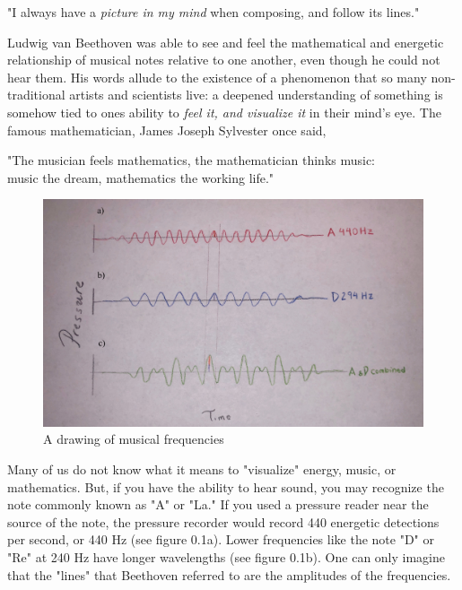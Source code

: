 \documentclass[12pt]{ucsddissertation}
\begin{document}
\begin{dissertationintroduction}
\begin{center}
    "I always have a \textit{picture in my mind} when composing, and follow its lines."
\end{center}

Ludwig van Beethoven was able to see and feel the mathematical and energetic relationship of musical notes relative to one another, even though he could not hear them. His words allude to the existence of a phenomenon that so many non-traditional artists and scientists live: a deepened understanding of something is somehow tied to ones ability to \textit{feel it, and visualize it} in their mind's eye. The famous mathematician, James Joseph Sylvester once said, 

\begin{center}
    "The musician feels mathematics, the mathematician thinks music: \\ music the dream, mathematics the working life."
\end{center}

\begin{figure}
\centering
        \includegraphics[scale=0.1]{frequencies.jpeg}
        \caption{A drawing of musical frequencies}
\label{fig:frequencies of music}
\end{figure}

Many of us do not know what it means to "visualize" energy, music, or mathematics. But, if you have the ability to hear sound, you may recognize the note commonly known as "A" or "La." If you used a pressure reader near the source of the note, the pressure recorder would record 440 energetic detections per second, or 440 Hz (see figure 0.1a). Lower frequencies like the note "D" or "Re" at 240 Hz have longer wavelengths (see figure 0.1b). One can only imagine that the "lines" that Beethoven referred to are the amplitudes of the frequencies. 


\end{dissertationintroduction}
\end{document}
